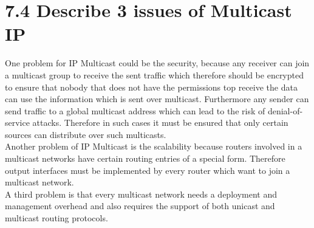 \documentclass{article}
\begin{document}
	\section*{7.4 Describe 3 issues of Multicast IP}
	\begin{adjustwidth}{2em}{2em}
		One problem for IP Multicast could be the security, because any receiver can join a multicast group to receive the sent traffic which therefore should be encrypted to ensure that nobody that does not have the permissions top receive the data can use the information which is sent over multicast. Furthermore any sender can send traffic to a global multicast address which can lead to the risk of denial-of-service attacks. Therefore in such cases it must be ensured that only certain sources can distribute over such multicasts. \\
		Another problem of IP Multicast is the scalability because routers involved in a multicast networks have certain routing entries of a special form. Therefore output interfaces must be implemented by every router which want to join a multicast network. \\
		A third problem is that every multicast network needs a deployment and management overhead and also requires the support of both unicast and multicast routing protocols.
	\end{adjustwidth}
\end{document}

